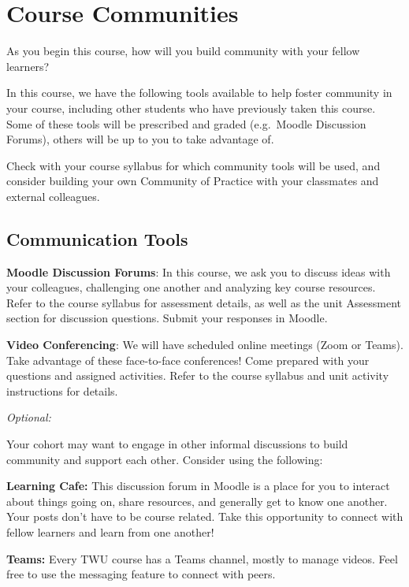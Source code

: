 \documentclass[
]{book}
\begin{document}
\hypertarget{course-communities}{%
\chapter*{Course Communities}\label{course-communities}}

As you begin this course, how will you build community with your fellow learners?

In this course, we have the following tools available to help foster community in your course, including other students who have previously taken this course. Some of these tools will be prescribed and graded (e.g.~Moodle Discussion Forums), others will be up to you to take advantage of.

Check with your course syllabus for which community tools will be used, and consider building your own Community of Practice with your classmates and external colleagues.

\hypertarget{communication-tools}{%
\section*{Communication Tools}\label{communication-tools}}

\textbf{Moodle Discussion Forums}: In this course, we ask you to discuss ideas with your colleagues, challenging one another and analyzing key course resources. Refer to the course syllabus for assessment details, as well as the unit Assessment section for discussion questions. Submit your responses in Moodle.

\textbf{Video Conferencing}: We will have scheduled online meetings (Zoom or Teams). Take advantage of these face-to-face conferences! Come prepared with your questions and assigned activities. Refer to the course syllabus and unit activity instructions for details.

\emph{Optional:}

Your cohort may want to engage in other informal discussions to build community and support each other. Consider using the following:

\textbf{Learning Cafe:} This discussion forum in Moodle is a place for you to interact about things going on, share resources, and generally get to know one another. Your posts don't have to be course related. Take this opportunity to connect with fellow learners and learn from one another!

\textbf{Teams:} Every TWU course has a Teams channel, mostly to manage videos. Feel free to use the messaging feature to connect with peers.
\end{document}
